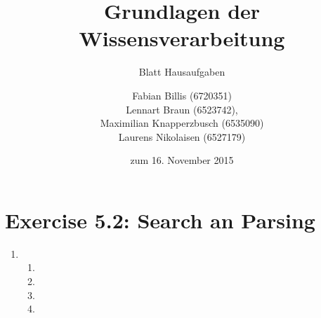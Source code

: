 \documentclass[a4paper]{scrartcl}
\title{Grundlagen der Wissensverarbeitung}
\subtitle{Blatt {\blattnr} Hausaufgaben}
\author{
    Fabian Billis (6720351) \\
    Lennart Braun (6523742), \\
    Maximilian Knapperzbusch (6535090) \\
    Laurens Nikolaisen (6527179) \\
}
\date{zum 16. November 2015}
\def \blattnr {5}
\begin{document}
\maketitle

\section*{Exercise \blattnr.2: Search an Parsing}

\begin{enumerate}
    \item
        \begin{enumerate}[label=(\alph*)]
            \item

            \item

            \item

            \item

        \end{enumerate}


\end{enumerate}
\end{document}
